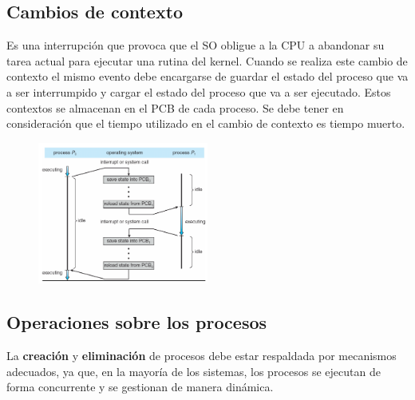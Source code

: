 \documentclass{templateNote}
\begin{document}
\subsection*{Cambios de contexto}
Es una interrupción que provoca que el SO obligue a la CPU a abandonar su tarea actual para ejecutar una rutina del kernel. 
Cuando se realiza este cambio de contexto el mismo evento debe encargarse de guardar el estado del proceso que va a ser interrumpido y cargar el estado del proceso que va a ser ejecutado.
Estos contextos se almacenan en el PCB de cada proceso. Se debe tener en consideración que el tiempo utilizado en el cambio de contexto es tiempo muerto.

\begin{figure}[H]
    \centering
    \includegraphics[width=0.5\textwidth]{img/cambioCont.png}
\end{figure}


\subsection*{Operaciones sobre los procesos}
La \textbf{creación} y \textbf{eliminación} de procesos debe estar respaldada por mecanismos adecuados, ya que, en la mayoría de los sistemas, los procesos se ejecutan de forma concurrente y se gestionan de manera dinámica.
\end{document}
